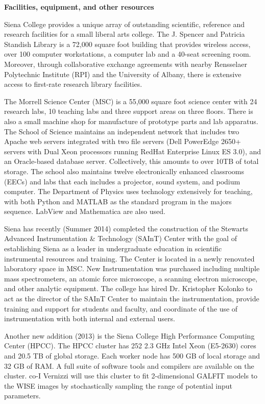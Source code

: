 \documentclass[11pt,preprint]{aastex}
\begin{document}

\noindent
{\Large\bf Facilities, equipment, and other resources}


Siena College provides a unique array of outstanding scientific, reference and research facilities 
for a small liberal arts college.  The J. Spencer and Patricia Standish Library is a 72,000 square foot 
building that provides wireless access, over 100 computer workstations, a computer lab and a 40-seat 
screening room.  Moreover, through collaborative exchange agreements with nearby Rensselaer Polytechnic Institute (RPI) 
and the University of Albany, there is extensive access to first-rate research library facilities.

The Morrell Science Center (MSC) is a 55,000 square foot science center with 24 research labs, 10 teaching labs and 
three support areas on three floors. There is also a small machine shop for manufacture of prototype parts and 
lab apparatus.  The School of Science maintains an independent network that includes two Apache web servers integrated 
with two file servers (Dell PowerEdge 2650+ servers with Dual Xeon processors running RedHat Enterprise Linux ES 3.0), 
and an Oracle-based database server.  Collectively, this amounts to over 10TB of total storage. The school also maintains 
twelve electronically enhanced classrooms (EECs) and labs that each includes a projector, sound system, and podium computer. 
The Department of Physics uses technology extensively for teaching, with both Python and MATLAB as the standard program in the 
majors sequence.  LabView and Mathematica are also used. 

Siena has recently (Summer 2014) completed the construction of the 
Stewarts Advanced Instrumentation \& Technology (SAInT) Center with the goal of 
establishing Siena as a leader in undergraduate education in scientific 
instrumental resources and training. The Center is located in a newly renovated 
laboratory space in MSC. New Instrumentation was 
purchased including multiple mass spectrometers, 
an atomic force microscope, a scanning electron microscope, and other
analytic equipment.
The college has hired Dr. Kristopher Kolonko to act as the director of the SAInT Center to 
maintain the instrumentation, provide training and support for students and faculty, and 
coordinate of the use of instrumentation with both internal and external users.

Another new addition (2013) is the Siena College High Performance Computing Center (HPCC). 
The HPCC cluster has 252 2.3 GHz Intel Xeon (E5-2630) 
cores and 20.5 TB of global storage.  Each worker node has 500 GB of local storage and 32 GB of 
RAM. A full suite of software tools and compilers are available on the
cluster.  co-I Vernizzi will use this cluster
to fit 2-dimensional GALFIT models to the WISE images by
stochastically sampling the range of potential input parameters.
\end{document}
